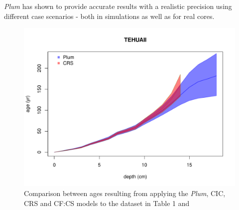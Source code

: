 \documentclass [10pt] {article}
\newcommand{\ac}{\color{red} }  %
\newcommand{\ca}{\color{black}} %
\begin{document}
\textit{Plum} has shown to provide accurate results with a realistic precision using different case scenarios \citep{Aquino2018,Aquino2020} - both in simulations as well as for real cores.

\begin{figure}[h!]
 \centering
	\includegraphics[width=.75\linewidth]{TEHUAII-2.pdf}
	\caption{Comparison between ages resulting from applying the \textit{Plum}, CIC, CRS and CF:CS models to the dataset in Table 1 and \citet{Sanchez-Cabeza2012}} 
  \label{fig:tehuaii}
\end{figure}


\end{document}
